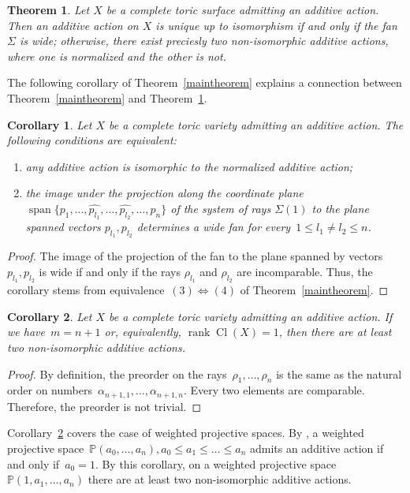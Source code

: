 \documentclass[a4paper,reqno,12pt]{amsart}
\DeclareMathOperator {\spann}{span}
\DeclareMathOperator {\Cl}{Cl}
\DeclareMathOperator {\rank}{rank}
\def\P  {\mathbb P}
\newtheorem{corollary}{Corollary}
\newtheorem{theorem}{Theorem}
\theoremstyle{definition}
\begin{document}
\begin{theorem}{\cite[Theorem 3]{S}}\label{surface}
Let $X$ be a complete toric surface  admitting an additive action.
  Then an additive action on $X$ is unique up to isomorphism if and only if the fan $\Sigma$ is wide; otherwise, there exist preciesly two non-isomorphic additive actions, where one is normalized and the other is not.
\end{theorem}
The following corollary of Theorem~\ref{maintheorem} explains a connection between Theorem~\ref{maintheorem} and Theorem~\ref{surface}.
\begin{corollary}
  Let $X$ be a complete toric variety admitting an additive action. The following conditions are equivalent:
  \begin{enumerate}
  \item any additive action is isomorphic to the normalized additive action;
  \item the image under the  projection along the coordinate plane~${\spann\{p_1, \ldots, \widehat{p_{l_1}}, \ldots, \widehat{p_{l_2}}, \ldots, p_n\}}$ of the system of rays $\Sigma(1)$ to the plane spanned vectors $p_{l_1}, p_{l_2}$ determines a wide fan for every~${1 \leq l_1\neq l_2 \leq n}$.

  \end{enumerate}
\end{corollary}
\begin{proof}
  The image of the projection of the fan to the plane spanned by vectors $p_{l_1}, p_{l_2}$ is wide if and only if the rays $\rho_{l_1}$ and $\rho_{l_2}$ are incomparable.
  Thus, the corollary stems from  equivalence~$(3)\Leftrightarrow (4)$ of Theorem~\ref{maintheorem}.
\end{proof}
\begin{corollary}\label{weightedprojective}
  Let $X$ be a complete toric variety admitting an additive action.
  If we have~$m=n+1$ or, equivalently, $\rank \Cl(X)=1$, then there are at least two non-isomorphic additive actions.
\end{corollary}
\begin{proof}
By definition, the preorder on the rays~${\rho_1, \ldots, \rho_n}$ is the same as the natural order on numbers~${\alpha_{n+1, 1}, \ldots, \alpha_{n+1, n}}$.
  Every two elements are comparable.
  Therefore, the preorder is not trivial.
\end{proof}
  Corollary~\ref{weightedprojective} covers the case of weighted projective spaces.
  By \cite[Proposition~2]{AR}, a weighted projective space~${\P(a_0, \ldots, a_n)}, {a_0 \leq a_1 \leq \ldots \leq a_n}$ admits an additive action if and only if~$a_0=1$.
  By this corollary, on a weighted projective space~$\P(1, a_1, \ldots, a_n)$ there are at least two non-isomorphic additive actions.
  \smallskip
\end{document}
